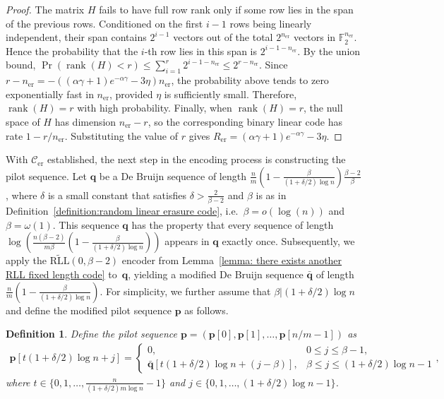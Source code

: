 \documentclass[journal,letterpaper,onecolumn,11pt]{IEEEtran}
\newcommand{\cC}{\mathcal{C}}
\newtheorem{definition}{Definition}
\begin{document}
\begin{proof}
The matrix $H$ fails to have full row rank only if some row lies in the span of
the previous rows. Conditioned on the first $i-1$ rows being linearly
independent, their span contains $2^{i-1}$ vectors out of the total
$2^{n_{\mathrm{er}}}$ vectors in $\mathbb{F}_2^{n_{\mathrm{er}}}$. Hence the
probability that the $i$-th row lies in this span is
$2^{i-1-n_{\mathrm{er}}}$.
By the union bound,
$\Pr(\operatorname{rank}(H)<r)\le\sum_{i=1}^{r}2^{i-1-n_{\mathrm{er}}}\le2^{r-n_{\mathrm{er}}}$.
Since
$r-n_{\mathrm{er}}=-\left((\alpha\gamma+1)e^{-\alpha\gamma}-3\eta\right)n_{\mathrm{er}}$,
the probability above tends to zero exponentially fast in
$n_{\mathrm{er}}$, provided $\eta$ is sufficiently small. Therefore,
$\operatorname{rank}(H)=r$ with high probability.
Finally, when $\operatorname{rank}(H)=r$, the null space of $H$ has dimension
$n_{\mathrm{er}}-r$, so the corresponding binary linear code has rate
$1-r/n_{\mathrm{er}}$. Substituting the value of $r$ gives
$R_{\mathrm{er}}=(\alpha\gamma+1)e^{-\alpha\gamma}-3\eta$.
\end{proof}
With $\cC_{\mathrm{er}}$ established, the next step in the encoding process is constructing the pilot sequence.
Let $\mathbf{q}$ be a De Bruijn sequence of length $\frac{n}{m}(1-\frac{\beta}{(1+\delta/2)\log n})\frac{\beta-2}{\beta}$, where $\delta$ is a small constant that satisfies $\delta > \frac{2}{\beta-2}$ and $\beta$ is as in Definition~\ref{definition:random linear erasure code}, i.e.~$\beta=o(\log(n))$ and~$\beta=\omega(1)$. 
This sequence $\mathbf{q}$ has the property that every sequence of length $\log(\frac{n(\beta-2)}{m\beta}(1-\frac{\beta}{(1+\delta/2)\log n}))$ appears in $\mathbf{q}$ exactly once.
Subsequently, we apply the $\widetilde{\text{RLL}}(0,\beta-2)$ encoder from Lemma~\ref{lemma: there exists another RLL fixed length code} to~$\mathbf{q}$, yielding a modified De Bruijn sequence $\bar{\mathbf{q}}$ of length $\frac{n}{m}(1-\frac{\beta}{(1+\delta/2)\log n})$. 
For simplicity, we further assume that $\beta|(1+\delta/2)\log n$ and define the modified pilot sequence $\mathbf{p}$ as follows.
\begin{definition}\label{Definition: marker sequence for improved encoding}
    Define the pilot sequence $\mathbf{p}=(\mathbf{p}[0],\mathbf{p}[1],\dots,\mathbf{p}[n/m-1])$ as
\begin{align*}
    \mathbf{p}[t(1+\delta/2)\log n+j]=
    \begin{cases}
    0, & 0 \leq j \leq \beta-1, \\
    \bar{\mathbf{q}}[t(1+\delta/2)\log n + (j-\beta)], & \beta \leq j \leq (1+\delta/2)\log n-1
\end{cases},
\end{align*}
where $t \in \{0,1,\dots, \frac{n}{(1+\delta/2)m\log n}-1\}$ and $j \in \{0, 1, \dots, (1+\delta/2)\log n-1\}$.
\end{definition}
\end{document}
